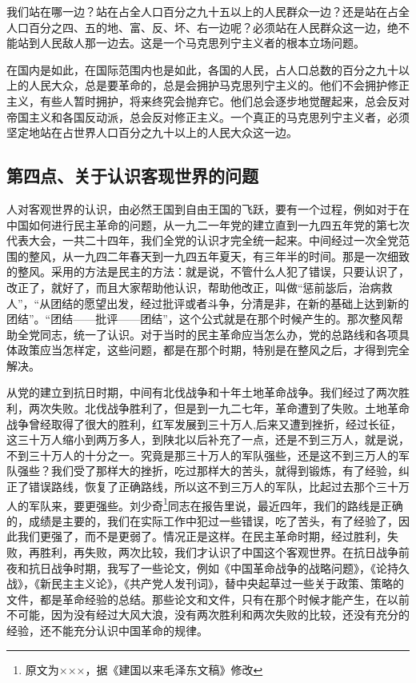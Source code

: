 我们站在哪一边？站在占全人口百分之九十五以上的人民群众一边？还是站在占全人口百分之四、五的地、富、反、坏、右一边呢？必须站在人民群众这一边，绝不能站到人民敌人那一边去。这是一个马克思列宁主义者的根本立场问题。

在国内是如此，在国际范围内也是如此，各国的人民，占人口总数的百分之九十以上的人民大众，总是要革命的，总是会拥护马克思列宁主义的。他们不会拥护修正主义，有些人暂时拥护，将来终究会抛弃它。他们总会逐步地觉醒起来，总会反对帝国主义和各国反动派，总会反对修正主义。一个真正的马克思列宁主义者，必须坚定地站在占世界人口百分之九十以上的人民大众这一边。

\subsection{第四点、关于认识客现世界的问题}

人对客观世界的认识，由必然王国到自由王国的飞跃，要有一个过程，例如对于在中国如何进行民主革命的问题，从一九二一年党的建立直到一九四五年党的第七次代表大会，一共二十四年，我们全党的认识才完全统一起来。中间经过一次全党范围的整风，从一九四二年春天到一九四五年夏天，有三年半的时间。那是一次细致的整风。采用的方法是民主的方法：就是说，不管什么人犯了错误，只要认识了，改正了，就好了，而且大家帮助他认识，帮助他改正，叫做“惩前毖后，治病救人”，“从团结的愿望出发，经过批评或者斗争，分清是非，在新的基础上达到新的团结”。“团结——批评——团结”，这个公式就是在那个时候产生的。那次整风帮助全党同志，统一了认识。对于当时的民主革命应当怎么办，党的总路线和各项具体政策应当怎样定，这些问题，都是在那个时期，特别是在整风之后，才得到完全解决。

从党的建立到抗日时期，中间有北伐战争和十年土地革命战争。我们经过了两次胜利，两次失败。北伐战争胜利了，但是到一九二七年，革命遭到了失败。土地革命战争曾经取得了很大的胜利，红军发展到三十万人,后来又遭到挫折，经过长征，这三十万人缩小到两万多人，到陕北以后补充了一点，还是不到三万人，就是说，不到三十万人的十分之一。究竟是那三十万人的军队强些，还是这不到三万人的军队强些？我们受了那样大的挫折，吃过那样大的苦头，就得到锻炼，有了经验，纠正了错误路线，恢复了正确路线，所以这不到三万人的军队，比起过去那个三十万人的军队来，要更强些。刘少奇\footnote{原文为×××，据《建国以来毛泽东文稿》修改}同志在报告里说，最近四年，我们的路线是正确的，成绩是主要的，我们在实际工作中犯过一些错误，吃了苦头，有了经验了，因此我们更强了，而不是更弱了。情况正是这样。在民主革命时期，经过胜利，失败，再胜利，再失败，两次比较，我们才认识了中国这个客观世界。在抗日战争前夜和抗日战争时期，我写了一些论文，例如《中国革命战争的战略问题》，《论持久战》，《新民主主义论》，《共产党人发刊词》，替中央起草过一些关于政策、策略的文件，都是革命经验的总结。那些论文和文件，只有在那个时候才能产生，在以前不可能，因为没有经过大风大浪，没有两次胜利和两次失败的比较，还没有充分的经验，还不能充分认识中国革命的规律。

